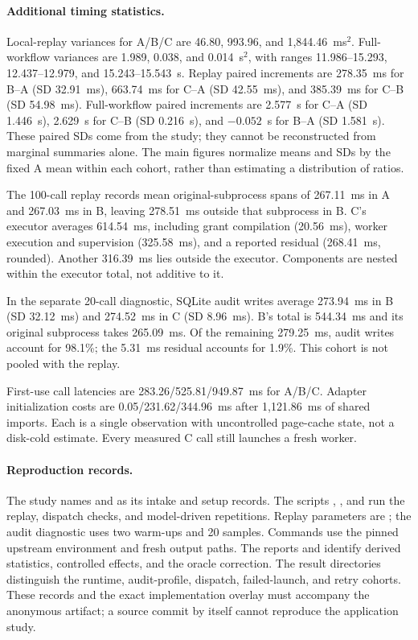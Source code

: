 \paragraph{Additional timing statistics.}
Local-replay variances for A/B/C are 46.80, 993.96, and 1,844.46~ms$^2$.
Full-workflow variances are 1.989, 0.038, and 0.014~s$^2$, with ranges
11.986--15.293, 12.437--12.979, and 15.243--15.543~s.
Replay paired increments are 278.35~ms for B--A (SD 32.91~ms),
663.74~ms for C--A (SD 42.55~ms), and 385.39~ms for C--B (SD 54.98~ms).
Full-workflow paired increments are 2.577~s for C--A (SD 1.446~s),
2.629~s for C--B (SD 0.216~s), and $-0.052$~s for B--A (SD 1.581~s).
These paired SDs come from the study; they cannot be reconstructed from
marginal summaries alone. The main figures normalize means and SDs by the
fixed A mean within each cohort, rather than estimating a distribution of ratios.

The 100-call replay records mean original-subprocess spans of 267.11~ms in A
and 267.03~ms in B, leaving 278.51~ms outside that subprocess in B.
C's executor averages 614.54~ms, including grant compilation (20.56~ms),
worker execution and supervision (325.58~ms), and a reported residual
(268.41~ms, rounded). Another 316.39~ms lies outside the executor.
Components are nested within the executor total, not additive to it.

In the separate 20-call diagnostic, SQLite audit writes average 273.94~ms
in B (SD 32.12~ms) and 274.52~ms in C (SD 8.96~ms).
B's total is 544.34~ms and its original subprocess takes 265.09~ms.
Of the remaining 279.25~ms, audit writes account for 98.1\%; the 5.31~ms
residual accounts for 1.9\%. This cohort is not pooled with the replay.

First-use call latencies are 283.26/525.81/949.87~ms for A/B/C. Adapter
initialization costs are 0.05/231.62/344.96~ms after 1,121.86~ms of shared imports.
Each is a single observation with uncontrolled page-cache state, not a disk-cold
estimate. Every measured C call still launches a fresh worker.

\paragraph{Reproduction records.}
The study names  and  as its intake
and setup records. The scripts ,
, and  run the replay,
dispatch checks, and model-driven repetitions. Replay parameters are
; the audit diagnostic uses two warm-ups and
20 samples. Commands use the pinned upstream environment and fresh output paths.
The reports  and  identify
derived statistics, controlled effects, and the oracle correction. The result
directories distinguish the runtime, audit-profile, dispatch, failed-launch,
and retry cohorts. These records and the exact implementation overlay must
accompany the anonymous artifact; a source commit by itself cannot reproduce
the application study.

